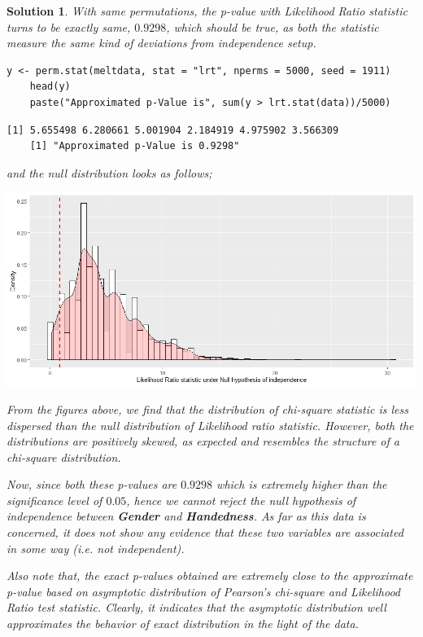 \documentclass[12pt]{article}
\theoremstyle{problemstyle}
\newtheorem*{solution*}{Solution}
\begin{document}
\begin{solution*}
With same permutations, the p-value with Likelihood Ratio statistic turns to be exactly same, $0.9298$, which should be true, as both the statistic measure the same kind of deviations from independence setup.

\begin{lstlisting}[style = R-code]
	y <- perm.stat(meltdata, stat = "lrt", nperms = 5000, seed = 1911)
	head(y)
	paste("Approximated p-Value is", sum(y > lrt.stat(data))/5000)
\end{lstlisting}

\begin{lstlisting}[style = R-output]
	[1] 5.655498 6.280661 5.001904 2.184919 4.975902 3.566309
	[1] "Approximated p-Value is 0.9298"
\end{lstlisting}

and the null distribution looks as follows;

\begin{center}
	\includegraphics[width=\linewidth]{lrt.jpeg}
\end{center}

From the figures above, we find that the distribution of chi-square statistic is less dispersed than the null distribution of Likelihood ratio statistic. However, both the distributions are positively skewed, as expected and resembles the structure of a chi-square distribution.

Now, since both these p-values are $0.9298$ which is extremely higher than the significance level of $0.05$, hence we cannot reject the null hypothesis of independence between \textbf{Gender} and \textbf{Handedness}. As far as this data is concerned, it does not show any evidence that these two variables are associated in some way (i.e. not independent).

Also note that, the exact p-values obtained are extremely close to the approximate p-value based on asymptotic distribution of Pearson's chi-square and Likelihood Ratio test statistic. Clearly, it indicates that the asymptotic distribution well approximates the behavior of exact distribution in the light of the data.


\end{solution*}
\end{document}

